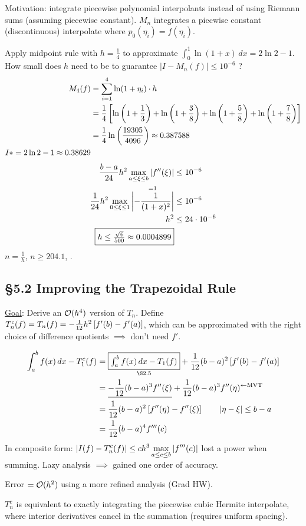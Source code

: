 \documentclass[]{article}
\begin{document}
Motivation: integrate piecewise polynomial interpolants instead of using Riemann sums (assuming piecewise constant).
$M_n$ integrates a piecwise constant (discontinuous) interpolate where $p_0(\eta_i)=f(\eta_i)$.
\begin{example}
	Apply midpoint rule with $h=\frac14$ to approximate $\int_0^1 \ln(1+x)\,dx=2\ln 2-1$.
	How small does $h$ need to be to guarantee $|I-M_n(f)|\leq 10^{-6}$ ?
	\begin{align*}
		M_4(f) &= \sum_{i=1}^4 \ln(1+\eta_i)\cdot h \\
			   &= \frac14\left[ \ln\left(1+\frac13\right)+\ln\left(1+\frac38\right)+\ln\left(1+\frac58\right)+\ln\left(1+\frac78\right)\right] \\
			   &= \frac14 \ln\left(\frac{19305}{4096}\right) \approx 0.387588 \\
		I *= 2\ln 2-1 \approx 0.38629
	\end{align*}
	\begin{align*}
		\frac{b-a}{24} h^2 \max_{a\leq\xi\leq b} |f''(\xi)| &\leq 10^{-6} \\
		\frac1{24} h^2 \max_{0\leq\xi\leq 1} \overset{=1}{\left|-\frac1{(1+x)^2}\right|} & \leq 10^{-6} \\
		h^2 &\leq 24\cdot 10^{-6} \\
		\fbox{$ h \leq \frac{\sqrt6}{500} \approx 0.0004899$}
	\end{align*}
	$n = \frac1h$, $n\geq 204.1$, .
\end{example}

\subsection*{\S5.2 Improving the Trapezoidal Rule}

\ul{Goal}: Derive an $\mathcal{O}(h^4)$ version of $T_n$.
Define $T_n^c(f) = T_n(f) = -\frac1{12} h^2 \left[ f'(b)-f'(a) \right]$, which can be approximated with the right choice of difference quotients $\implies$ don't need $f'$.
\begin{observe}
	\begin{align*}
		\int_a^b f(x)\,dx - T_1^c(f)
		&= \us{\text{\S2.5}}{\fbox{$\int_a^b f(x)\,dx - T_1(f)$}} + \frac1{12}(b-a)^2\blr{f'(b)-f'(a)} \\
		&= \ul{-\frac1{12}(b-a)^3 f''(\xi)} + \frac1{12} (b-a)^3 f''(\eta)^{\la\text{\text{MVT}}} \\
		&= \frac1{12} (b-a)^2 \blr{f''(\eta)-f''(\xi)} \qquad |\eta-\xi|\leq b-a \\
		&= \frac1{12} (b-a)^4 f'''(c)
	\end{align*}
	In composite form:
	$\displaystyle |I(f)-T_n^c(f)| \leq ch^3 \max_{a\leq c\leq b} |f'''(c)| $
	lost a power when summing.
	Lazy analysis $\implies$ gained one order of accuracy.
\end{observe}
\begin{fact}
	Error $= \mathcal{O}(h^2)$ using a more refined analysis (Grad HW).
\end{fact}
\begin{fact}
	$T_n^c$ is equivalent to exactly integrating the piecewise cubic Hermite interpolate, where interior derivatives cancel in the summation (requires uniform spacing).
\end{fact}
\end{document}
